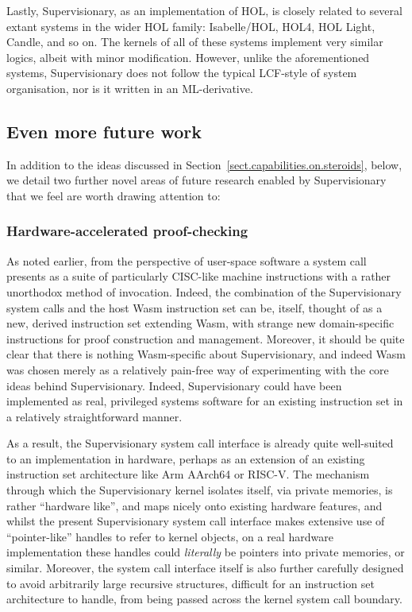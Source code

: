 \documentclass[a4paper, UKenglish, cleveref, autoref, thm-restate, colorlinks]{lipics-v2021}
\begin{document}
Lastly, Supervisionary, as an implementation of HOL, is closely related to several extant systems in the wider HOL family: Isabelle/HOL, HOL4, HOL Light, Candle, and so on.
The kernels of all of these systems implement very similar logics, albeit with minor modification.
However, unlike the aforementioned systems, Supervisionary does not follow the typical LCF-style of system organisation, nor is it written in an ML-derivative.

\subsection{Even more future work}
\label{subsect.future.work}

In addition to the ideas discussed in Section~\ref{sect.capabilities.on.steroids}, below, we detail two further novel areas of future research enabled by Supervisionary that we feel are worth drawing attention to:

\subsubsection*{Hardware-accelerated proof-checking}

As noted earlier, from the perspective of user-space software a system call presents as a suite of particularly CISC-like machine instructions with a rather unorthodox method of invocation.
Indeed, the combination of the Supervisionary system calls and the host Wasm instruction set can be, itself, thought of as a new, derived instruction set extending Wasm, with strange new domain-specific instructions for proof construction and management.
Moreover, it should be quite clear that there is nothing Wasm-specific about Supervisionary, and indeed Wasm was chosen merely as a relatively pain-free way of experimenting with the core ideas behind Supervisionary.
Indeed, Supervisionary could have been implemented as real, privileged systems software for an existing instruction set in a relatively straightforward manner.

As a result, the Supervisionary system call interface is already quite well-suited to an implementation in hardware, perhaps as an extension of an existing instruction set architecture like Arm AArch64 or RISC-V.
The mechanism through which the Supervisionary kernel isolates itself, via private memories, is rather ``hardware like'', and maps nicely onto existing hardware features, and whilst the present Supervisionary system call interface makes extensive use of ``pointer-like'' handles to refer to kernel objects, on a real hardware implementation these handles could \emph{literally} be pointers into private memories, or similar.
Moreover, the system call interface itself is also further carefully designed to avoid arbitrarily large recursive structures, difficult for an instruction set architecture to handle, from being passed across the kernel system call boundary.
\end{document}
